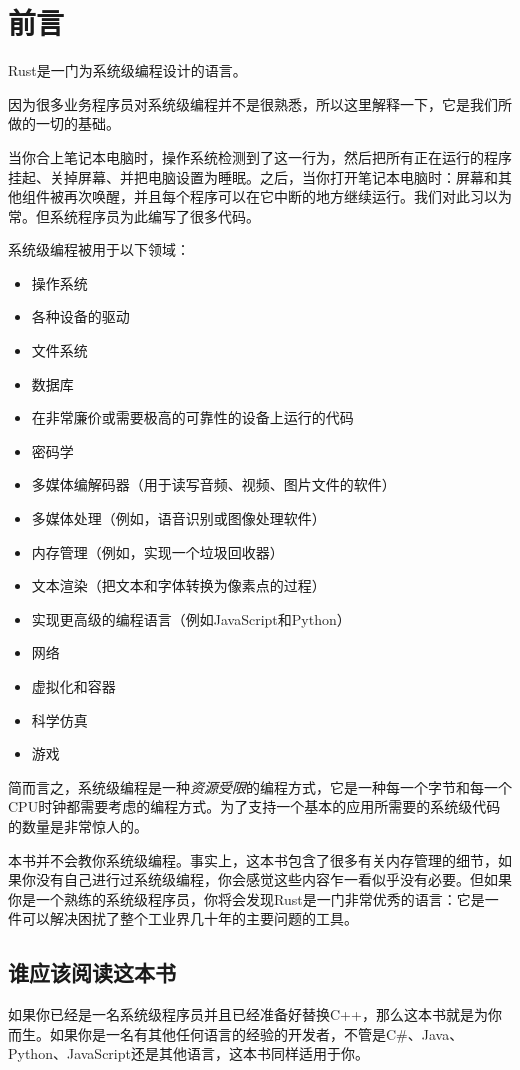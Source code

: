 \chapter{前言}
Rust是一门为系统级编程设计的语言。

因为很多业务程序员对系统级编程并不是很熟悉，所以这里解释一下，它是我们所做的一切的基础。

当你合上笔记本电脑时，操作系统检测到了这一行为，然后把所有正在运行的程序挂起、关掉屏幕、并把电脑设置为睡眠。之后，当你打开笔记本电脑时：屏幕和其他组件被再次唤醒，并且每个程序可以在它中断的地方继续运行。我们对此习以为常。但系统程序员为此编写了很多代码。

系统级编程被用于以下领域：
\begin{itemize}
    \item 操作系统
    \item 各种设备的驱动
    \item 文件系统
    \item 数据库
    \item 在非常廉价或需要极高的可靠性的设备上运行的代码
    \item 密码学
    \item 多媒体编解码器（用于读写音频、视频、图片文件的软件）
    \item 多媒体处理（例如，语音识别或图像处理软件）
    \item 内存管理（例如，实现一个垃圾回收器）
    \item 文本渲染（把文本和字体转换为像素点的过程）
    \item 实现更高级的编程语言（例如JavaScript和Python）
    \item 网络
    \item 虚拟化和容器
    \item 科学仿真
    \item 游戏
\end{itemize}

简而言之，系统级编程是一种\emph{资源受限}的编程方式，它是一种每一个字节和每一个CPU时钟都需要考虑的编程方式。为了支持一个基本的应用所需要的系统级代码的数量是非常惊人的。

本书并不会教你系统级编程。事实上，这本书包含了很多有关内存管理的细节，如果你没有自己进行过系统级编程，你会感觉这些内容乍一看似乎没有必要。但如果你是一个熟练的系统级程序员，你将会发现Rust是一门非常优秀的语言：它是一件可以解决困扰了整个工业界几十年的主要问题的工具。

\section*{谁应该阅读这本书}
如果你已经是一名系统级程序员并且已经准备好替换C++，那么这本书就是为你而生。如果你是一名有其他任何语言的经验的开发者，不管是C\#、Java、Python、JavaScript还是其他语言，这本书同样适用于你。

